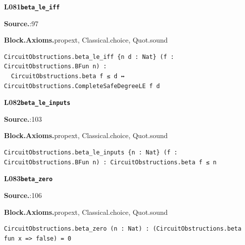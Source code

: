 \par\medskip\noindent\begin{minipage}{\textwidth}
{\small\bfseries L081\enspace\texttt{beta\_le\_iff}\par}
{\footnotesize\raggedright\textbf{Source.}\enspace{}:97\par
\textbf{Block.}\quad\textbf{Axioms.}\enspace propext, Classical.choice, Quot.sound\par}\nopagebreak
\begin{lstlisting}
CircuitObstructions.beta_le_iff {n d : Nat} (f : CircuitObstructions.BFun n) :
  CircuitObstructions.beta f ≤ d ↔ CircuitObstructions.CompleteSafeDegreeLE f d
\end{lstlisting}
\end{minipage}\par

\par\medskip\noindent\begin{minipage}{\textwidth}
{\small\bfseries L082\enspace\texttt{beta\_le\_inputs}\par}
{\footnotesize\raggedright\textbf{Source.}\enspace{}:103\par
\textbf{Block.}\quad\textbf{Axioms.}\enspace propext, Classical.choice, Quot.sound\par}\nopagebreak
\begin{lstlisting}
CircuitObstructions.beta_le_inputs {n : Nat} (f : CircuitObstructions.BFun n) : CircuitObstructions.beta f ≤ n
\end{lstlisting}
\end{minipage}\par

\par\medskip\noindent\begin{minipage}{\textwidth}
{\small\bfseries L083\enspace\texttt{beta\_zero}\par}
{\footnotesize\raggedright\textbf{Source.}\enspace{}:106\par
\textbf{Block.}\quad\textbf{Axioms.}\enspace propext, Classical.choice, Quot.sound\par}\nopagebreak
\begin{lstlisting}
CircuitObstructions.beta_zero (n : Nat) : (CircuitObstructions.beta fun x => false) = 0
\end{lstlisting}
\end{minipage}\par

